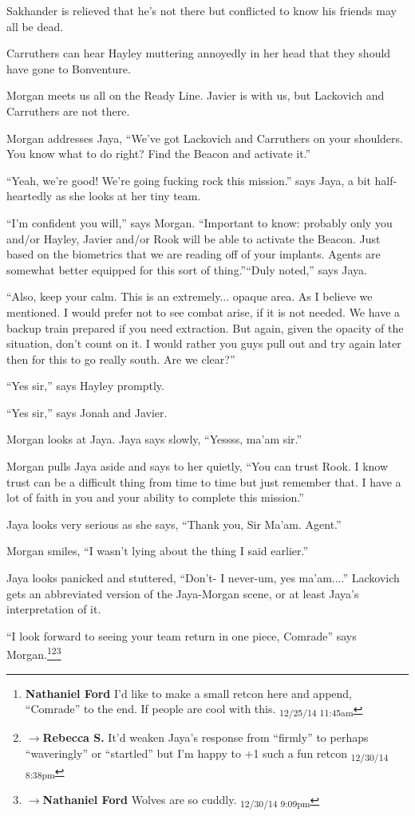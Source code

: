 Sakhander is relieved that he's not there but conflicted to know his friends may all be dead.

Carruthers can hear Hayley muttering annoyedly in her head that they should have gone to Bonventure.



Morgan meets us all on the Ready Line.  Javier is with us, but Lackovich and Carruthers are not there.

Morgan addresses Jaya, ``We've got Lackovich and Carruthers on your shoulders.  You know what to do right?  Find the Beacon and activate it.''

``Yeah, we're good!  We're going fucking rock this mission.'' says Jaya, a bit half-heartedly as she looks at her tiny team.

``I'm confident you will,'' says Morgan.  ``Important to know: probably only you and/or Hayley, Javier and/or Rook will be able to activate the Beacon.  Just based on the biometrics that we are reading off of your implants.  Agents are somewhat better equipped for this sort of thing.''``Duly noted,'' says Jaya. 

``Also, keep your calm.  This is an extremely... opaque area.  As I believe we mentioned.  I would prefer not to see combat arise, if it is not needed.  We have a backup train prepared if you need extraction.  But again, given the opacity of the situation, don't count on it.  I would rather you guys pull out and try again later then for this to go really south.  Are we clear?''

``Yes sir,'' says Hayley promptly.

``Yes sir,'' says Jonah and Javier.

Morgan looks at Jaya.  Jaya says slowly, ``Yessss, ma'am sir.''

Morgan pulls Jaya aside and says to her quietly, ``You can trust Rook.  I know trust can be a difficult thing from time to time but just remember that.  I have a lot of faith in you and your ability to complete this mission.''

Jaya looks very serious as she says, ``Thank you, Sir Ma'am. Agent.''

Morgan smiles, ``I wasn't lying about the thing I said earlier.''

Jaya looks panicked and stuttered, ``Don't- I never-um, yes ma'am....''  Lackovich gets an abbreviated version of the Jaya-Morgan scene, or at least Jaya's interpretation of it.

``I look forward to seeing your team return in one piece, Comrade'' says Morgan.\footnote{\textbf{Nathaniel Ford }I'd like to make a small retcon here and append, ``Comrade'' to the end. If people are cool with this. \textsubscript{12/25/14 11:45am}}\footnote{$\rightarrow$\textbf{Rebecca S. }It'd weaken Jaya's response from ``firmly'' to perhaps ``waveringly'' or ``startled'' but I'm happy to +1 such a fun retcon \textsubscript{12/30/14 8:38pm}}\footnote{$\rightarrow$\textbf{Nathaniel Ford }Wolves are so cuddly. \textsubscript{12/30/14 9:09pm}}

